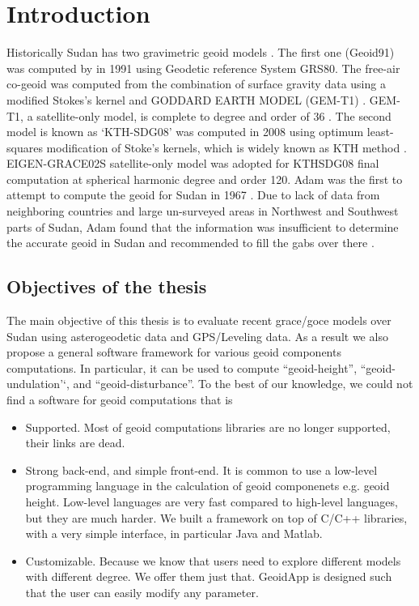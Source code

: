 \chapter{Introduction}

Historically Sudan has two gravimetric geoid models \cite{ahmed_similar_paper}. The first one (Geoid91) was computed by \cite{fashir} in 1991 using Geodetic reference System GRS80. The free-air co-geoid was computed from the combination of surface gravity data using a modified Stokes's kernel and GODDARD EARTH MODEL (GEM-T1)  \cite{fashir}. GEM-T1, a satellite-only model, is complete to degree and order of 36 \cite{nasa}. The second model is known as `KTH-SDG08' was computed in 2008 using optimum least-squares modification of Stoke's kernels, which is widely known as KTH method \cite{ahmed_msc}. EIGEN-GRACE02S
satellite-only model was adopted for KTHSDG08 final computation at spherical harmonic degree and order 120. Adam was the first to attempt to compute the geoid for Sudan in 1967 \cite{adam}. Due to lack of data from neighboring countries and large un-surveyed areas in Northwest and Southwest parts of Sudan, Adam found that the information was insufficient to determine the accurate geoid in Sudan and recommended to fill the gabs over there \cite{ahmed_msc}. 


\section{Objectives of the thesis}
The main objective of this thesis is to evaluate recent grace/goce models over Sudan using asterogeodetic data and GPS/Leveling data. As a result we also propose a general software framework for various geoid components computations. In particular, it can be used to compute ``geoid-height'', ``geoid-undulation'`, and ``geoid-disturbance''. To the best of our knowledge, we could not find a software for geoid computations that is
\begin{itemize}
	\item Supported. Most of geoid computations libraries are no longer supported, their links are dead.
	\item Strong back-end, and simple front-end. It is common to use a low-level programming language in the calculation of geoid componenets e.g. geoid height. Low-level languages are very fast compared to high-level languages, but they are much harder. We built a framework on top of C/C++ libraries, with a very simple interface, in particular Java and Matlab.
	\item Customizable. Because we know that users need to explore different models with different degree. We offer them just that. GeoidApp is designed such that the user can easily modify any parameter.
\end{itemize}

